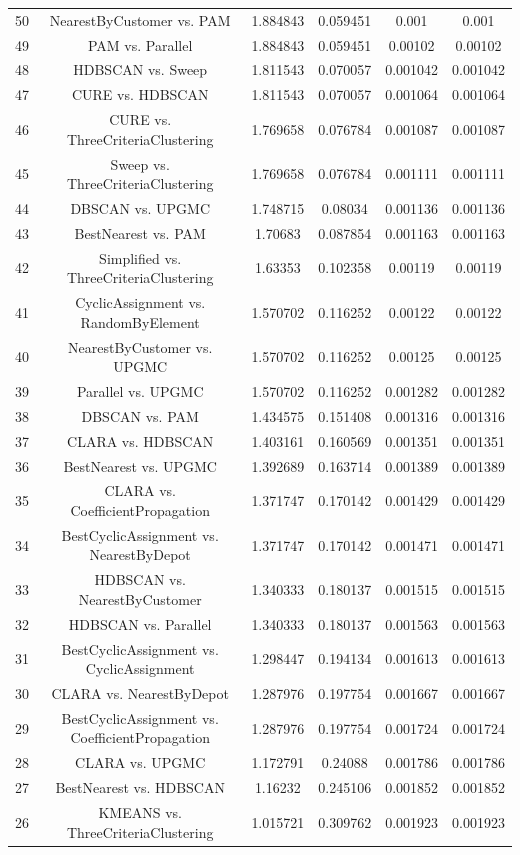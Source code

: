 \documentclass[a4paper,10pt]{article}
\begin{document}
\begin{landscape}
\begin{table}[!htp]
\begin{tabular}{cccccc}
50&NearestByCustomer vs. PAM&1.884843&0.059451&0.001&0.001\\
49&PAM vs. Parallel&1.884843&0.059451&0.00102&0.00102\\
48&HDBSCAN vs. Sweep&1.811543&0.070057&0.001042&0.001042\\
47&CURE vs. HDBSCAN&1.811543&0.070057&0.001064&0.001064\\
46&CURE vs. ThreeCriteriaClustering&1.769658&0.076784&0.001087&0.001087\\
45&Sweep vs. ThreeCriteriaClustering&1.769658&0.076784&0.001111&0.001111\\
44&DBSCAN vs. UPGMC&1.748715&0.08034&0.001136&0.001136\\
43&BestNearest vs. PAM&1.70683&0.087854&0.001163&0.001163\\
42&Simplified vs. ThreeCriteriaClustering&1.63353&0.102358&0.00119&0.00119\\
41&CyclicAssignment vs. RandomByElement&1.570702&0.116252&0.00122&0.00122\\
40&NearestByCustomer vs. UPGMC&1.570702&0.116252&0.00125&0.00125\\
39&Parallel vs. UPGMC&1.570702&0.116252&0.001282&0.001282\\
38&DBSCAN vs. PAM&1.434575&0.151408&0.001316&0.001316\\
37&CLARA vs. HDBSCAN&1.403161&0.160569&0.001351&0.001351\\
36&BestNearest vs. UPGMC&1.392689&0.163714&0.001389&0.001389\\
35&CLARA vs. CoefficientPropagation&1.371747&0.170142&0.001429&0.001429\\
34&BestCyclicAssignment vs. NearestByDepot&1.371747&0.170142&0.001471&0.001471\\
33&HDBSCAN vs. NearestByCustomer&1.340333&0.180137&0.001515&0.001515\\
32&HDBSCAN vs. Parallel&1.340333&0.180137&0.001563&0.001563\\
31&BestCyclicAssignment vs. CyclicAssignment&1.298447&0.194134&0.001613&0.001613\\
30&CLARA vs. NearestByDepot&1.287976&0.197754&0.001667&0.001667\\
29&BestCyclicAssignment vs. CoefficientPropagation&1.287976&0.197754&0.001724&0.001724\\
28&CLARA vs. UPGMC&1.172791&0.24088&0.001786&0.001786\\
27&BestNearest vs. HDBSCAN&1.16232&0.245106&0.001852&0.001852\\
26&KMEANS vs. ThreeCriteriaClustering&1.015721&0.309762&0.001923&0.001923\\

\end{tabular}
\end{table}
\end{landscape}
\end{document}
